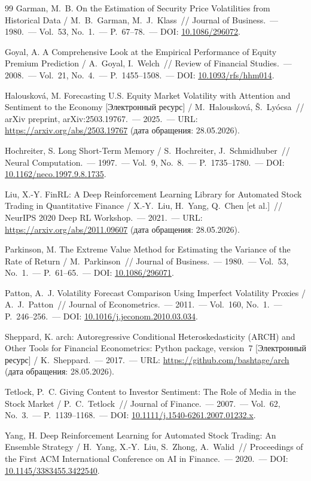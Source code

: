 \begin{thebibliography}{99}
Garman, M.~B.
On the Estimation of Security Price Volatilities from Historical Data /
M.~B.~Garman, M.~J.~Klass~// Journal of Business.~--- 1980.~---
Vol.~53, No.~1.~--- P.~67--78.~---
DOI: \href{https://doi.org/10.1086/296072}{10.1086/296072}.

Goyal, A.
A Comprehensive Look at the Empirical Performance of
Equity Premium Prediction /
A.~Goyal, I.~Welch~// Review of Financial Studies.~--- 2008.~---
Vol.~21, No.~4.~--- P.~1455--1508.~---
DOI: \href{https://doi.org/10.1093/rfs/hhm014}{10.1093/rfs/hhm014}.

Halouskov\'{a}, M.
Forecasting U.S. Equity Market Volatility with Attention and
Sentiment to the Economy [Электронный ресурс] /
M.~Halouskov\'{a}, \v{S}.~Ly\'{o}csa~//
arXiv preprint, arXiv:2503.19767.~--- 2025.~---
URL: \url{https://arxiv.org/abs/2503.19767}
(дата обращения: 28.05.2026).

Hochreiter, S.
Long Short-Term Memory /
S.~Hochreiter, J.~Schmidhuber~// Neural Computation.~--- 1997.~---
Vol.~9, No.~8.~--- P.~1735--1780.~---
DOI: \href{https://doi.org/10.1162/neco.1997.9.8.1735}{10.1162/neco.1997.9.8.1735}.

Liu, X.-Y.
FinRL: A Deep Reinforcement Learning Library for Automated Stock
Trading in Quantitative Finance /
X.-Y.~Liu, H.~Yang, Q.~Chen [et al.]~//
NeurIPS 2020 Deep RL Workshop.~--- 2021.~---
URL: \url{https://arxiv.org/abs/2011.09607}
(дата обращения: 28.05.2026).

Parkinson, M.
The Extreme Value Method for Estimating the Variance of the Rate of Return /
M.~Parkinson~// Journal of Business.~--- 1980.~---
Vol.~53, No.~1.~--- P.~61--65.~---
DOI: \href{https://doi.org/10.1086/296071}{10.1086/296071}.

Patton, A.~J.
Volatility Forecast Comparison Using Imperfect Volatility Proxies /
A.~J.~Patton~// Journal of Econometrics.~--- 2011.~---
Vol.~160, No.~1.~--- P.~246--256.~---
DOI: \href{https://doi.org/10.1016/j.jeconom.2010.03.034}{10.1016/j.jeconom.2010.03.034}.

Sheppard, K.
arch: Autoregressive Conditional Heteroskedasticity (ARCH) and
Other Tools for Financial Econometrics: Python package, version~7
[Электронный ресурс] /
K.~Sheppard.~--- 2017.~---
URL: \url{https://github.com/bashtage/arch}
(дата обращения: 28.05.2026).

Tetlock, P.~C.
Giving Content to Investor Sentiment: The Role of Media in
the Stock Market /
P.~C.~Tetlock~// Journal of Finance.~--- 2007.~---
Vol.~62, No.~3.~--- P.~1139--1168.~---
DOI: \href{https://doi.org/10.1111/j.1540-6261.2007.01232.x}{10.1111/j.1540-6261.2007.01232.x}.

Yang, H.
Deep Reinforcement Learning for Automated Stock Trading: An Ensemble
Strategy /
H.~Yang, X.-Y.~Liu, S.~Zhong, A.~Walid~//
Proceedings of the First ACM International Conference on AI
in Finance.~--- 2020.~---
DOI: \href{https://doi.org/10.1145/3383455.3422540}{10.1145/3383455.3422540}.

\end{thebibliography}
